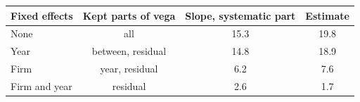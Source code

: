 \begin{tabular}{@{}lccc@{}}
\toprule
Fixed effects & Kept parts of vega & Slope, systematic part & Estimate \\
\midrule
None & all & 15.3 & 19.8 \\
Year & between, residual & 14.8 & 18.9 \\
Firm & year, residual & 6.2 & 7.6 \\
Firm and year & residual & 2.6 & 1.7 \\
\bottomrule
\end{tabular}
